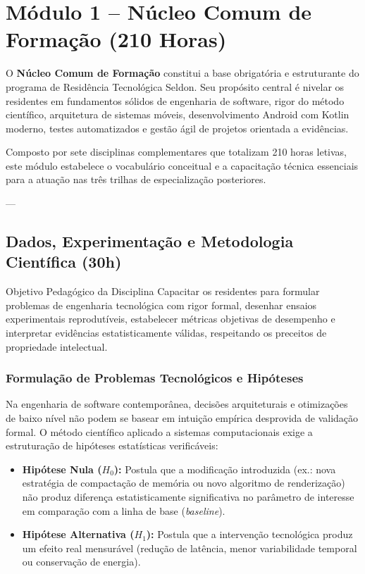 \chapter{Módulo 1 – Núcleo Comum de Formação (210 Horas)}
\label{chap:modulo1}

O \textbf{Núcleo Comum de Formação} constitui a base obrigatória e estruturante do programa de Residência Tecnológica Seldon. Seu propósito central é nivelar os residentes em fundamentos sólidos de engenharia de software, rigor do método científico, arquitetura de sistemas móveis, desenvolvimento Android com Kotlin moderno, testes automatizados e gestão ágil de projetos orientada a evidências.

Composto por sete disciplinas complementares que totalizam 210 horas letivas, este módulo estabelece o vocabulário conceitual e a capacitação técnica essenciais para a atuação nas três trilhas de especialização posteriores.

---

\section{Dados, Experimentação e Metodologia Científica (30h)}

\begin{pedagogico}{Objetivo Pedagógico da Disciplina}
Capacitar os residentes para formular problemas de engenharia tecnológica com rigor formal, desenhar ensaios experimentais reprodutíveis, estabelecer métricas objetivas de desempenho e interpretar evidências estatisticamente válidas, respeitando os preceitos de propriedade intelectual.
\end{pedagogico}

\subsection{Formulação de Problemas Tecnológicos e Hipóteses}
Na engenharia de software contemporânea, decisões arquiteturais e otimizações de baixo nível não podem se basear em intuição empírica desprovida de validação formal. O método científico aplicado a sistemas computacionais exige a estruturação de hipóteses estatísticas verificáveis:
\begin{itemize}
    \item \textbf{Hipótese Nula ($H_0$):} Postula que a modificação introduzida (ex.: nova estratégia de compactação de memória ou novo algoritmo de renderização) não produz diferença estatisticamente significativa no parâmetro de interesse em comparação com a linha de base (\textit{baseline}).
    \item \textbf{Hipótese Alternativa ($H_1$):} Postula que a intervenção tecnológica produz um efeito real mensurável (redução de latência, menor variabilidade temporal ou conservação de energia).
\end{itemize}

